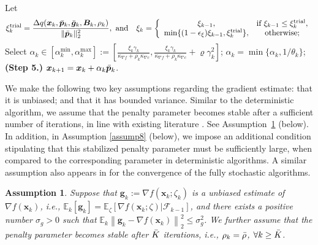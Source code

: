 \documentclass[aos]{imsart}
\numberwithin{equation}{section}
\theoremstyle{plain}
\newtheorem{assumption}{Assumption}
\begin{document}
\begin{algorithm}[htb]
\begin{algorithmic}[1]
  \STATE Let 
  \begin{equation}
  \label{strategy_xi}
   \xi_{k}^{\text{trial}} =  \frac{\Delta q(\bm{x}_k,\Bar{\bm{p}}_k, \Bar{\bm{g}}_k,\bm{B}_k,\rho_k)}{\|\Bar{\bm{p}}_k\|_2^2},
 ~  \text{and} \quad
      \xi_k = \left\{ \begin{array}{cc}
          \xi_{k-1}, & \text{if}~\xi_{k-1} \leq \xi_{k}^{\text{trial}},  \\
          \min\{(1-\epsilon_{\xi})\xi_{k-1},\xi_{k}^{\text{trial}}\},  & \text{otherwise;}
      \end{array} \right.
  \end{equation}
  \STATE Select $\alpha_k \in \left[\alpha_k^{\text{min}}, \alpha_k^{\max} \right] :=  \left[ \frac{ \xi_{k}\gamma_k}{\kappa_{\nabla f} + \rho_k \kappa_{\nabla c}} , \frac{ \xi_{k}\gamma_k}{\kappa_{\nabla f} + \rho_k \kappa_{\nabla c}} + \varrho \gamma_k^2 \right]$;
  \STATE $\alpha_k = \min\{\alpha_k,1/\theta_k\}$;
  \STATE \textbf{(Step 5.)} $\bm{x}_{k+1} = \bm{x}_{k} + \alpha_k \Bar{\bm{p}}_{k}$.
  \ENDFOR
 \end{algorithmic}
 \end{algorithm}
 
We make the following two key assumptions regarding the gradient estimate: that it is unbiased; and that it has bounded variance. 
Similar to the deterministic algorithm, we assume that the penalty parameter becomes stable after a sufficient number of iterations, in line with existing literature \cite{berahas2021sequential, qiu2023sequential}. 
See Assumption~\ref{assump3} (below).
In addition, in Assumption \ref{assump8} (below), we impose an additional condition stipulating that this stabilized penalty parameter must be sufficiently large, when compared to the corresponding parameter in deterministic algorithms. A similar assumption also appears in \cite{berahas2021sequential} for the convergence of the fully stochastic algorithms. 

\begin{assumption}
\label{assump3}
    Suppose that $\bm{g}_k:= \nabla f(\bm{x}_k;\zeta_k)$ is a unbiased estimate of $\nabla f(\bm{x}_k)$, i.e., $\mathbb{E}_k[\bm{g}_k] = \mathbb{E}_{\zeta}\left[ \nabla f(\bm{x}_k;\zeta)|\mathcal{F}_{k-1}\right] $, and there exists a positive number $\sigma_{g}>0$ such that $\mathbb{E}_{k}\left\|\bm{g}_k - \nabla f(\bm{x}_k)  \right\|_2^2 \leq \sigma_{g}^2$. We further assume that the penalty parameter becomes stable after $\Bar{K}$ iterations, i.e., $\rho_k = \Bar{\rho}$, $\forall k \geq \Bar{K}$. 
\end{assumption}
\end{document}

